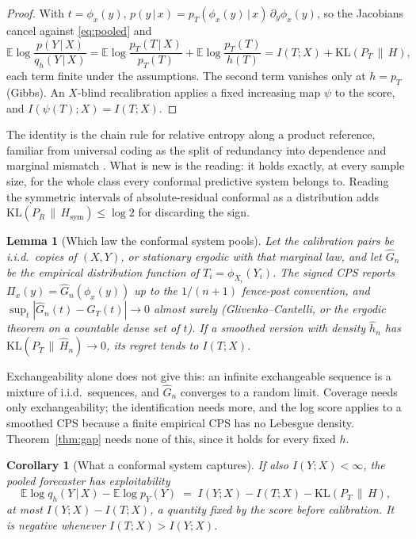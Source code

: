 \documentclass[11pt]{article}
\newtheorem{lemma}{Lemma}
\newtheorem{corollary}{Corollary}
\theoremstyle{definition}
\newcommand{\E}{\mathbb{E}}
\newcommand{\KL}{\mathrm{KL}}
\newcommand{\given}{\,\vert\,}
\begin{document}
\begin{proof}
With $t=\phi_x(y)$, $p(y\given x)=p_T(\phi_x(y)\given x)\,\partial_y\phi_x(y)$, so the
Jacobians cancel against \eqref{eq:pooled} and
\[
\E\log\frac{p(Y\given X)}{q_h(Y\given X)}
=\E\log\frac{p_T(T\given X)}{p_T(T)}+\E\log\frac{p_T(T)}{h(T)}
=I(T;X)+\KL(P_T\,\|\,H),
\]
each term finite under the assumptions. The second term vanishes only at $h=p_T$ (Gibbs).
An $X$-blind recalibration applies a fixed increasing map $\psi$ to the score, and
$I(\psi(T);X)=I(T;X)$.
\end{proof}

The identity is the chain rule for relative entropy along a product reference, familiar
from universal coding as the split of redundancy into dependence and marginal mismatch
\citep{clarke1990,grunwald2007}. What is new is the reading: it holds exactly, at every
sample size, for the whole class every conformal predictive system belongs to. Reading the
symmetric intervals of absolute-residual conformal as a distribution adds
$\KL(P_R\,\|\,H_{\mathrm{sym}})\le\log 2$ for discarding the sign.

\begin{lemma}[Which law the conformal system pools]\label{lem:ident}
Let the calibration pairs be i.i.d.\ copies of $(X,Y)$, or stationary ergodic with that
marginal law, and let $\widehat G_n$ be the empirical distribution function of
$T_i=\phi_{X_i}(Y_i)$. The signed CPS reports $\Pi_x(y)=\widehat G_n(\phi_x(y))$ up to the
$1/(n+1)$ fence-post convention, and $\sup_t|\widehat G_n(t)-G_T(t)|\to0$ almost surely
(Glivenko--Cantelli, or the ergodic theorem on a countable dense set of $t$). If a smoothed
version with density $\hat h_n$ has $\KL(P_T\,\|\,\hat H_n)\to0$, its regret tends to
$I(T;X)$.
\end{lemma}

Exchangeability alone does not give this: an infinite exchangeable sequence is a mixture of
i.i.d.\ sequences, and $\widehat G_n$ converges to a random limit. Coverage needs only
exchangeability; the identification needs more, and the log score applies to a smoothed CPS
because a finite empirical CPS has no Lebesgue density. Theorem~\ref{thm:gap} needs none of
this, since it holds for every fixed $h$.

\begin{corollary}[What a conformal system captures]\label{cor:forecastability}
If also $I(Y;X)<\infty$, the pooled forecaster has exploitability
\begin{equation}\label{eq:captured}
  \E\log q_h(Y\given X)-\E\log p_Y(Y)\;=\;I(Y;X)-I(T;X)-\KL(P_T\,\|\,H),
\end{equation}
at most $I(Y;X)-I(T;X)$, a quantity fixed by the score before calibration. It is negative
whenever $I(T;X)>I(Y;X)$.
\end{corollary}
\end{document}
